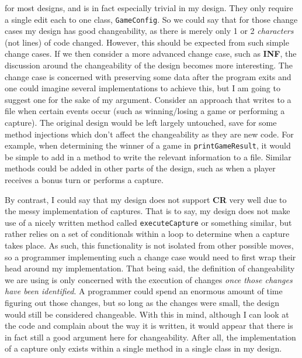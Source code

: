 \documentclass[10pt, a4paper, conference]{IEEEtran}
\begin{document}
for most designs, and is in fact especially trivial in my design. They only require
a single edit each to one class, \texttt{GameConfig}. So we could say that for those 
change cases my design has good changeability, as there is
merely only 1 or 2 \textit{characters} (not lines) of code changed. However,
this should be expected from such simple change cases. If we then consider a
more advanced change case, such as \textbf{INF}, the discussion
around the changeability of the design becomes more interesting. The change
case is concerned with preserving some data after the program exits and one
could imagine several implementations to achieve this, but I am going to
suggest one for the sake of my argument. Consider an
approach that writes to a file when certain events occur (such as
winning/losing a game or performing a capture). The original design would be
left largely untouched, save for some method injections which don't affect the
changeability as they are new code. For example, when determining the winner of
a game in \texttt{printGameResult}, it would be simple to add in a method to write 
the relevant information to a file. Similar methods could be added in other
parts of the design, such as when a player receives a bonus turn or performs
a capture.

By contrast, I could say that my design does not support \textbf{CR} very well due to the messy
implementation of captures. That is to say, my design does not make use of
a nicely written method called \texttt{executeCapture} or something similar,
but rather relies on a set of conditionals within a loop to determine when
a capture takes place. As such, this functionality is not isolated from other
possible moves, so a programmer implementing such a change case would need to
first wrap their head around my implementation. That being said, the definition
of changeability we are using is only concerned with the execution of changes
\textit{once those changes have been identified}. A programmer could spend an
enormous amount of time figuring out those changes, but so long as the changes
were small, the design would still be considered changeable. With this in mind,
although I can look at the code and complain about the way it is written, it
would appear that there is in fact still a good argument here for changeability.
After all, the implementation of a capture only exists within a single method
in a single class in my design.
\end{document}

